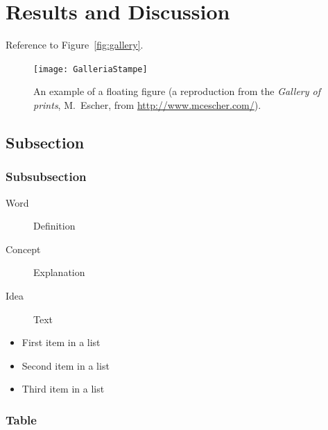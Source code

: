 \documentclass[
10pt, %
letterpaper, %
oneside, %
headinclude,footinclude, %
BCOR5mm, %
]{article}
\begin{document}
\section{Results and Discussion}

Reference to Figure~\vref{fig:gallery}. %

\begin{figure}[tb]
\centering 
\texttt{[image: GalleriaStampe]} 
\caption[An example of a floating figure]{An example of a floating figure (a reproduction from the \emph{Gallery of prints}, M.~Escher, from \url{http://www.mcescher.com/}).} %
\label{fig:gallery} 
\end{figure}



\subsection{Subsection}


\subsubsection{Subsubsection}


\begin{description}
\item[Word] Definition
\item[Concept] Explanation
\item[Idea] Text
\end{description}


\begin{itemize}[noitemsep] %
\item First item in a list
\item Second item in a list
\item Third item in a list
\end{itemize}

\subsubsection{Table}
\end{document}
